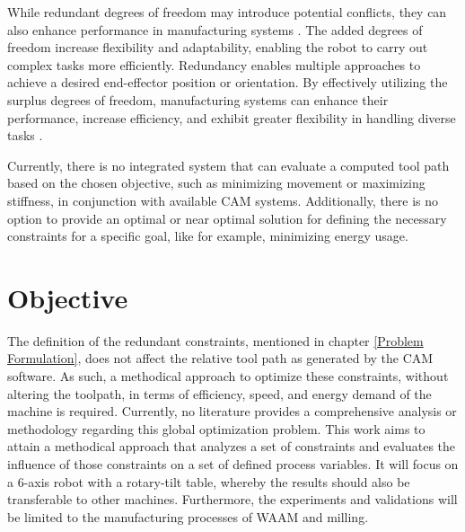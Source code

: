 
While redundant degrees of freedom may introduce potential conflicts, they can also enhance performance in manufacturing systems \cite{Ayten.2016}. The added degrees of freedom increase flexibility and adaptability, enabling the robot to carry out complex tasks more efficiently. Redundancy enables multiple approaches to achieve a desired end-effector position or orientation. By effectively utilizing the surplus degrees of freedom, manufacturing systems can enhance their performance, increase efficiency, and exhibit greater flexibility in handling diverse tasks \cite{Boscariol.2020}. 

Currently, there is no integrated system that can evaluate a computed tool path based on the chosen objective, such as minimizing movement or maximizing stiffness, in conjunction with available CAM systems. Additionally, there is no option to provide an optimal or near optimal solution for defining the necessary constraints for a specific goal, like for example, minimizing energy usage.


\section{Objective}%
The definition of the redundant constraints, mentioned in chapter \ref{Problem Formulation}, does not affect the relative tool path as generated by the CAM software. As such, a methodical approach to optimize these constraints, without altering the toolpath, in terms of efficiency, speed, and energy demand of the machine is required. Currently, no literature provides a comprehensive analysis or methodology regarding this global optimization problem.
This work aims to attain a methodical approach that analyzes a set of constraints and evaluates the influence of those constraints on a set of defined process variables. It will focus on a 6-axis robot with a rotary-tilt table, whereby the results should also be transferable to other machines. Furthermore, the experiments and validations will be limited to the manufacturing processes of WAAM and milling. 


